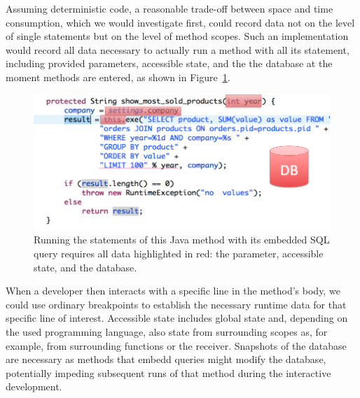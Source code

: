 Assuming deterministic code, a reasonable trade-off between space and time consumption, which we would investigate first, could record data not on the level of single statements but on the level of method scopes.
Such an implementation would record all data necessary to actually run a method with all its statement, including provided parameters, accessible state, and the the database at the moment methods are entered, as shown in Figure~\ref{fig:context_recording}.

\begin{figure}
    \includegraphics[width=\linewidth]{images/context_recording}
    \caption{Running the statements of this Java method with its embedded SQL query requires all data highlighted in red: the parameter, accessible state, and the database.}
    \label{fig:context_recording}
\end{figure}

When a developer then interacts with a specific line in the method's body, we could use ordinary breakpoints to establish the necessary runtime data for that specific line of interest. 
Accessible state includes global state and, depending on the used programming language, also state from surrounding scopes as, for example, from surrounding functions or the receiver.
Snapshots of the database are necessary as methods that embedd queries might modify the database, potentially impeding subsequent runs of that method during the interactive development.

